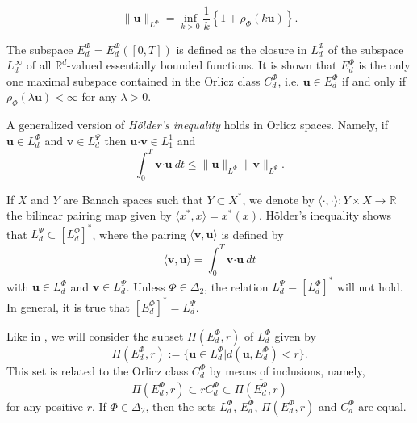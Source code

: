 \documentclass[twoside]{elsarticle}
\theoremstyle{remark}
\newcommand{\orlnor}{\|_{L^{\Phi}}}
\newcommand{\lphi}{L^{\Phi}}
\newcommand{\lpsi}{L^{\Psi}}
\newcommand{\ephi}{E^{\Phi}}
\newcommand{\claseor}{C^{\Phi}}
\renewcommand{\b}[1]{\boldsymbol{#1}}
\newcommand{\ccdot}{\b{\cdot}}
\renewcommand{\leq}{\leqslant}
\begin{document}
\begin{equation}\label{amemiya}
\|\b{u}\orlnor=\inf\limits_{k>0}\frac{1}{k}\left\{1+\rho_{\Phi}(k\b{u})\right\}.
\end{equation}



The subspace $\ephi_d=\ephi_d([0,T])$ is defined as the closure in $\lphi_d$ of the subspace $L^{\infty}_d$ of all $\mathbb{R}^d$-valued essentially bounded functions. It is shown that  $\ephi_d$ is the only one maximal subspace contained in the Orlicz class $\claseor_d$, i.e. 
$\b{u}\in\ephi_d$ if and only if $\rho_{\Phi}(\lambda \b{u})<\infty$ for any $\lambda>0$.  

A generalized version of \emph{H\"older's inequality} holds in Orlicz spaces. Namely, if $\b{u}\in\lphi_d$ and $\b{v}\in\lpsi_d$ then $\b{u}\ccdot\b{v}\in L_1^1$ and
\begin{equation}\label{holder}
\int_0^T\b{v}\ccdot\b{u}\ dt\leq \|\b{u}\orlnor\|\b{v}\|_{L^{\Psi}}.
\end{equation}




If $X$ and $Y$ are  Banach spaces such that  $Y\subset X^*$, we denote by $\langle\cdot,\cdot\rangle:Y\times X\to\mathbb{R}$ the bilinear pairing  map given by $\langle x^*,x\rangle=x^*(x)$. H\"older's inequality shows that $\lpsi_d\subset \left[\lphi_d\right]^*$, where the pairing  
$\langle \b{v}, \b{u}\rangle$
is defined by 
\begin{equation}\label{pairing}
  \langle \b{v},\b{u}\rangle=\int_0^T\b{v}\ccdot\b{u}\ dt
\end{equation}
with  $\b{u}\in\lphi_d$ and $\b{v}\in\lpsi_d$.
 Unless $\Phi \in \Delta_2$, the relation $\lpsi_d= \left[\lphi_d\right]^*$ will not hold. In general, it is true  that  $\left[\ephi_d\right]^*=\lpsi_d$.


Like in \cite{KR}, we will consider the subset $\Pi(\ephi_d,r)$ of $\lphi_d$ given by
\[\Pi(\ephi_d,r):=\{\b{u}\in\lphi_d| d(\b{u},\ephi_d)<r\}.\]
This set is related to the Orlicz class $\claseor_d$ by means of inclusions, namely,
\begin{equation}\label{inclusiones}\Pi(\ephi_d, r )\subset r \claseor_d\subset\overline{\Pi(\ephi_d,r)}
\end{equation}
for any positive $r$.
If $\Phi \in \Delta_2$,  then the sets $\lphi_d$, $\ephi_d$, $\Pi(\ephi_d,r)$ and $\claseor_d$ are equal.

\end{document}
